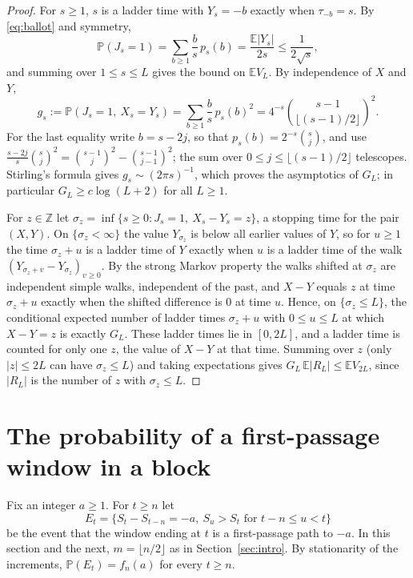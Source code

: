 \documentclass[11pt]{amsart}
\theoremstyle{remark}
\numberwithin{equation}{section}
\newcommand{\PP}{\mathbb{P}}
\newcommand{\EE}{\mathbb{E}}
\newcommand{\Z}{\mathbb{Z}}
\begin{document}
\begin{proof}
For $s\ge1$, $s$ is a ladder time with $Y_s=-b$ exactly when $\tau_{-b}=s$. By \eqref{eq:ballot} and symmetry,
\[
\PP(J_s=1)=\sum_{b\ge1}\frac bs\,p_s(b)=\frac{\EE|Y_s|}{2s}\le\frac1{2\sqrt s},
\]
and summing over $1\le s\le L$ gives the bound on $\EE V_L$. By independence of $X$ and $Y$,
\begin{equation}\label{eq:gs}
g_s:=\PP(J_s=1,\ X_s=Y_s)=\sum_{b\ge1}\frac bs\,p_s(b)^2=4^{-s}\binom{s-1}{\lfloor(s-1)/2\rfloor}^{2}.
\end{equation}
For the last equality write $b=s-2j$, so that $p_s(b)=2^{-s}\binom sj$, and use $\frac{s-2j}s\binom sj^2=\binom{s-1}j^2-\binom{s-1}{j-1}^2$; the sum over $0\le j\le\lfloor(s-1)/2\rfloor$ telescopes. Stirling's formula gives $g_s\sim(2\pi s)^{-1}$, which proves the asymptotics of $G_L$; in particular $G_L\ge c\log(L+2)$ for all $L\ge1$.

For $z\in\Z$ let $\sigma_z=\inf\{s\ge0:J_s=1,\ X_s-Y_s=z\}$, a stopping time for the pair $(X,Y)$. On $\{\sigma_z<\infty\}$ the value $Y_{\sigma_z}$ is below all earlier values of $Y$, so for $u\ge1$ the time $\sigma_z+u$ is a ladder time of $Y$ exactly when $u$ is a ladder time of the walk $(Y_{\sigma_z+v}-Y_{\sigma_z})_{v\ge0}$. By the strong Markov property the walks shifted at $\sigma_z$ are independent simple walks, independent of the past, and $X-Y$ equals $z$ at time $\sigma_z+u$ exactly when the shifted difference is $0$ at time $u$. Hence, on $\{\sigma_z\le L\}$, the conditional expected number of ladder times $\sigma_z+u$ with $0\le u\le L$ at which $X-Y=z$ is exactly $G_L$. These ladder times lie in $[0,2L]$, and a ladder time is counted for only one $z$, the value of $X-Y$ at that time. Summing over $z$ (only $|z|\le2L$ can have $\sigma_z\le L$) and taking expectations gives $G_L\,\EE|R_L|\le\EE V_{2L}$, since $|R_L|$ is the number of $z$ with $\sigma_z\le L$.
\end{proof}

\section{The probability of a first-passage window in a block}\label{sec:block}

Fix an integer $a\ge1$. For $t\ge n$ let
\[
E_t=\bigl\{S_t-S_{t-n}=-a,\ S_u>S_t\text{ for }t-n\le u<t\bigr\}
\]
be the event that the window ending at $t$ is a first-passage path to $-a$. In this section and the next, $m=\lfloor n/2\rfloor$ as in Section~\ref{sec:intro}. By stationarity of the increments, $\PP(E_t)=f_n(a)$ for every $t\ge n$.
\end{document}
